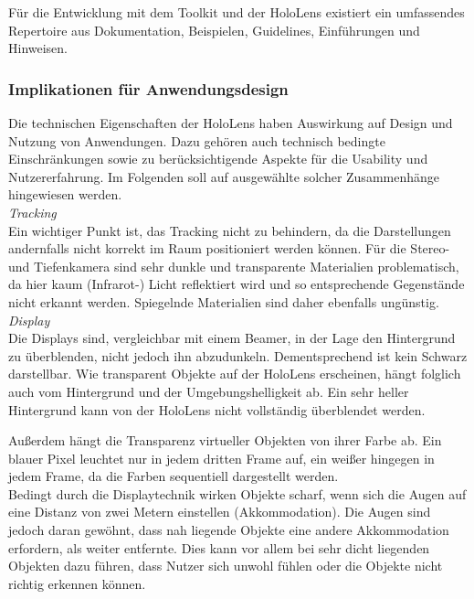 Für die Entwicklung mit dem Toolkit und der HoloLens existiert ein umfassendes Repertoire aus Dokumentation, Beispielen, Guidelines, Einführungen und Hinweisen.\\


\subsubsection{Implikationen für Anwendungsdesign}
\label{sec-2-1-4}
Die technischen Eigenschaften der HoloLens haben Auswirkung auf Design und Nutzung von Anwendungen. Dazu gehören auch technisch bedingte Einschränkungen sowie zu berücksichtigende Aspekte für die Usability und Nutzererfahrung. Im Folgenden soll auf ausgewählte solcher Zusammenhänge hingewiesen werden.\\

\textit{Tracking}\\
Ein wichtiger Punkt ist, das Tracking nicht zu behindern, da die Darstellungen andernfalls nicht korrekt im Raum positioniert werden können. Für die Stereo- und Tiefenkamera sind sehr dunkle und transparente Materialien problematisch, da hier kaum (Infrarot-) Licht reflektiert wird und so entsprechende Gegenstände nicht erkannt werden. Spiegelnde Materialien sind daher ebenfalls ungünstig.\\

\textit{Display}\\
Die Displays sind, vergleichbar mit einem Beamer, in der Lage den Hintergrund zu überblenden, nicht jedoch ihn abzudunkeln. Dementsprechend ist kein Schwarz darstellbar. Wie transparent Objekte auf der HoloLens erscheinen, hängt folglich auch vom Hintergrund und der Umgebungshelligkeit ab. Ein sehr heller Hintergrund kann von der HoloLens nicht vollständig überblendet werden.
\par
\noindent\hspace*{5mm}
Außerdem hängt die Transparenz virtueller Objekten von ihrer Farbe ab. Ein blauer Pixel leuchtet nur in jedem dritten Frame auf, ein weißer hingegen in jedem Frame, da die Farben sequentiell dargestellt werden.\\

Bedingt durch die Displaytechnik wirken Objekte scharf, wenn sich die Augen auf eine Distanz von zwei Metern einstellen (Akkommodation). Die Augen sind jedoch daran gewöhnt, dass nah liegende Objekte eine andere Akkommodation erfordern, als weiter entfernte. Dies kann vor allem bei sehr dicht liegenden Objekten dazu führen, dass Nutzer sich unwohl fühlen oder die Objekte nicht richtig erkennen können.

